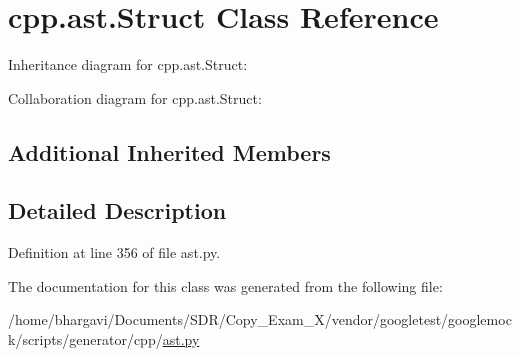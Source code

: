 \hypertarget{classcpp_1_1ast_1_1_struct}{}\section{cpp.\+ast.\+Struct Class Reference}
\label{classcpp_1_1ast_1_1_struct}


Inheritance diagram for cpp.\+ast.\+Struct\+:


Collaboration diagram for cpp.\+ast.\+Struct\+:
\subsection*{Additional Inherited Members}


\subsection{Detailed Description}


Definition at line 356 of file ast.\+py.



The documentation for this class was generated from the following file\+:\begin{DoxyCompactItemize}
\item 
/home/bhargavi/\+Documents/\+S\+D\+R/\+Copy\+\_\+\+Exam\+\_\+X/vendor/googletest/googlemock/scripts/generator/cpp/\hyperlink{ast_8py}{ast.\+py}\end{DoxyCompactItemize}

